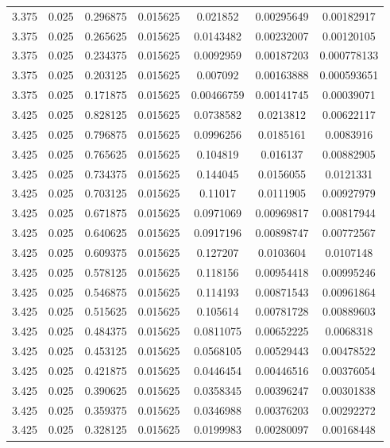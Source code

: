 \begin{flushleft}
\begin{longtable}{ccccccc}
3.375 & 0.025 & 0.296875 & 0.015625 & 0.021852 & 0.00295649 & 0.00182917  \\ 
3.375 & 0.025 & 0.265625 & 0.015625 & 0.0143482 & 0.00232007 & 0.00120105  \\ 
3.375 & 0.025 & 0.234375 & 0.015625 & 0.0092959 & 0.00187203 & 0.000778133  \\ 
3.375 & 0.025 & 0.203125 & 0.015625 & 0.007092 & 0.00163888 & 0.000593651  \\ 
3.375 & 0.025 & 0.171875 & 0.015625 & 0.00466759 & 0.00141745 & 0.00039071  \\ 
3.425 & 0.025 & 0.828125 & 0.015625 & 0.0738582 & 0.0213812 & 0.00622117  \\ 
3.425 & 0.025 & 0.796875 & 0.015625 & 0.0996256 & 0.0185161 & 0.0083916  \\ 
3.425 & 0.025 & 0.765625 & 0.015625 & 0.104819 & 0.016137 & 0.00882905  \\ 
3.425 & 0.025 & 0.734375 & 0.015625 & 0.144045 & 0.0156055 & 0.0121331  \\ 
3.425 & 0.025 & 0.703125 & 0.015625 & 0.11017 & 0.0111905 & 0.00927979  \\ 
3.425 & 0.025 & 0.671875 & 0.015625 & 0.0971069 & 0.00969817 & 0.00817944  \\ 
3.425 & 0.025 & 0.640625 & 0.015625 & 0.0917196 & 0.00898747 & 0.00772567  \\ 
3.425 & 0.025 & 0.609375 & 0.015625 & 0.127207 & 0.0103604 & 0.0107148  \\ 
3.425 & 0.025 & 0.578125 & 0.015625 & 0.118156 & 0.00954418 & 0.00995246  \\ 
3.425 & 0.025 & 0.546875 & 0.015625 & 0.114193 & 0.00871543 & 0.00961864  \\ 
3.425 & 0.025 & 0.515625 & 0.015625 & 0.105614 & 0.00781728 & 0.00889603  \\ 
3.425 & 0.025 & 0.484375 & 0.015625 & 0.0811075 & 0.00652225 & 0.0068318  \\ 
3.425 & 0.025 & 0.453125 & 0.015625 & 0.0568105 & 0.00529443 & 0.00478522  \\ 
3.425 & 0.025 & 0.421875 & 0.015625 & 0.0446454 & 0.00446516 & 0.00376054  \\ 
3.425 & 0.025 & 0.390625 & 0.015625 & 0.0358345 & 0.00396247 & 0.00301838  \\ 
3.425 & 0.025 & 0.359375 & 0.015625 & 0.0346988 & 0.00376203 & 0.00292272  \\ 
3.425 & 0.025 & 0.328125 & 0.015625 & 0.0199983 & 0.00280097 & 0.00168448  \\ 

\end{longtable}
\end{flushleft}
